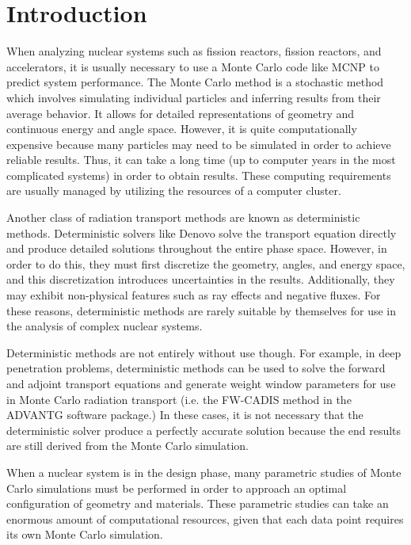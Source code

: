 \chapter{Introduction}
\label{chap:intro}

When analyzing nuclear systems such as fission reactors, fission reactors, and accelerators, it is usually necessary to use a Monte Carlo code like MCNP \cite{mcnp620} to predict system performance.
The Monte Carlo method is a stochastic method which involves simulating individual particles and inferring results from their average behavior.
It allows for detailed representations of geometry and continuous energy and angle space.
However, it is quite computationally expensive because many particles may need to be simulated in order to achieve reliable results.
Thus, it can take a long time (up to computer years in the most complicated systems) in order to obtain results.
These computing requirements are usually managed by utilizing the resources of a computer cluster.

Another class of radiation transport methods are known as deterministic methods.
Deterministic solvers like Denovo \cite{denovo} solve the transport equation directly and produce detailed solutions throughout the entire phase space.
However, in order to do this, they must first discretize the geometry, angles, and energy space, and this discretization introduces uncertainties in the results.
Additionally, they may exhibit non-physical features such as ray effects and negative fluxes.
For these reasons, deterministic methods are rarely suitable by themselves for use in the analysis of complex nuclear systems.

Deterministic methods are not entirely without use though.
For example, in deep penetration problems, deterministic methods can be used to solve the forward and adjoint transport equations and generate weight window parameters for use in Monte Carlo radiation transport (i.e. the FW-CADIS method \cite{fwcadis} in the ADVANTG \cite{advantg} software package.)
In these cases, it is not necessary that the deterministic solver produce a perfectly accurate solution because the end results are still derived from the Monte Carlo simulation.

When a nuclear system is in the design phase, many parametric studies of Monte Carlo simulations must be performed in order to approach an optimal configuration of geometry and materials.
These parametric studies can take an enormous amount of computational resources, given that each data point requires its own Monte Carlo simulation.

